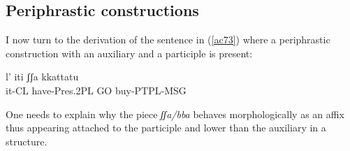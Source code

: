 \documentclass[output=paper]{langscibook}
\begin{document}
\subsection{Periphrastic constructions}

I now turn to the derivation of the sentence in (\ref{ac73}) where a periphrastic construction with an auxiliary and a participle is present:

\ea\label{ac73}
\gll l’    iti         ʃʃa   kkattatu\\
   it-CL  have-Pres.2PL    GO  buy-PTPL-MSG\\
\z

One needs to explain why the piece \textit{ʃʃa/bba} behaves morphologically as an affix thus appearing attached  to the participle and lower than the auxiliary in a structure.
\end{document}
